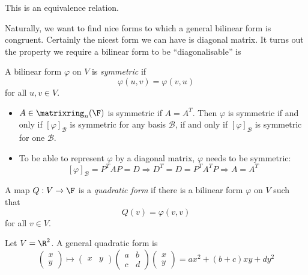 \documentclass[a4paper]{article}
\newcommand*{\M}{\matrixring}
\newcommand*{\basis}{\mathcal}
\theoremstyle{definition}
\begin{document}
\begin{note}
  This is an equivalence relation.
\end{note}

Naturally, we want to find nice forms to which a general bilinear form is congruent. Certainly the nicest form we can have is diagonal matrix. It turns out the property we require a bilinear form to be ``diagonalisable'' is

\begin{definition}[Symmetric]
  A bilinear form \(\varphi\) on \(V\) is \emph{symmetric} if
  \[
    \varphi(u, v) = \varphi(v, u)
  \]
  for all \(u, v \in V\).
\end{definition}

\begin{note}\leavevmode
  \begin{itemize}
  \item \(A \in \M_n(\F)\) is symmetric if \(A = A^T\). Then \(\varphi\) is symmetric if and only if \([\varphi]_{\basis B}\) is symmetric for any basis \(\basis B\), if and only if \([\varphi]_{\basis B}\) is symmetric for one \(\basis B\).
  \item To be able to represent \(\varphi\) by a diagonal matrix, \(\varphi\) needs to be symmetric:
    \[
      [\varphi]_{\basis B} = P^TAP = D \Rightarrow D^T = D = P^TA^TP \Rightarrow A = A^T
    \]
  \end{itemize}
\end{note}

\begin{definition}
  A map \(Q: V \to \F\) is a \emph{quadratic form} if there is a bilinear form \(\varphi\) on \(V\) such that
  \[
    Q(v) = \varphi(v, v)
  \]
  for all \(v \in V\).
\end{definition}

\begin{eg}
  Let \(V = \R^2\). A general quadratic form is
  \[
    \begin{pmatrix}
      x \\
      y
    \end{pmatrix}
    \mapsto
    \begin{pmatrix}
      x & y
    \end{pmatrix}
    \begin{pmatrix}
      a & b \\
      c & d
    \end{pmatrix}
    \begin{pmatrix}
      x \\
      y
    \end{pmatrix}
    = ax^2 + (b + c) xy + dy^2
  \]
\end{eg}
\end{document}
